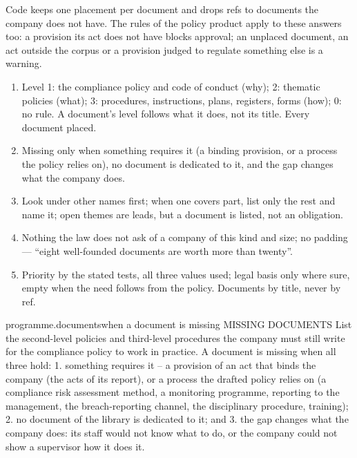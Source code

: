 Code keeps one placement per document and drops refs to documents the company does not have.
The rules of the policy product apply to these answers too: a provision its act does not have
blocks approval; an unplaced document, an act outside the corpus or a provision judged to
regulate something else is a warning.

\begin{enumerate}[itemsep=1pt, topsep=3pt]
  \item Level 1: the compliance policy and code of conduct (why); 2: thematic policies (what);
    3: procedures, instructions, plans, registers, forms (how); 0: no rule. A document's level
    follows what it does, not its title. Every document placed.
  \item Missing only when something requires it (a binding provision, or a process the policy
    relies on), no document is dedicated to it, and the gap changes what the company does.
  \item Look under other names first; when one covers part, list only the rest and name it;
    open themes are leads, but a document is listed, not an obligation.
  \item Nothing the law does not ask of a company of this kind and size; no padding ---
    \enquote{eight well-founded documents are worth more than twenty}.
  \item Priority by the stated tests, all three values used; legal basis only where sure, empty
    when the need follows from the policy. Documents by title, never by ref.
\end{enumerate}

\par\nopagebreak
\begin{promptexcerpt}{programme.documents}{when a document is missing}
MISSING DOCUMENTS
List the second-level policies and third-level procedures the company must still write for the compliance policy to work in practice. A document is missing when all three hold:
1. something requires it – a provision of an act that binds the company (the acts of its report), or a process the drafted policy relies on (a compliance risk assessment method, a monitoring programme, reporting to the management, the breach-reporting channel, the disciplinary procedure, training);
2. no document of the library is dedicated to it; and
3. the gap changes what the company does: its staff would not know what to do, or the company could not show a supervisor how it does it.
\end{promptexcerpt}

